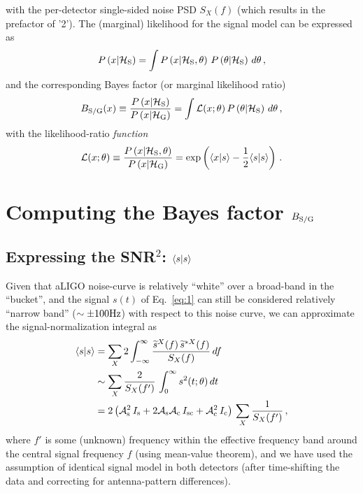 \documentclass[aps,prd,onecolumn,notitlepage,nofootinbib,superscriptaddress,altaffilletter,floatfix]{revtex4-1}
\begin{document}
with the per-detector single-sided noise PSD $S_X(f)$ (which results in the prefactor of '2').
The (marginal) likelihood for the signal model can be expressed as
\begin{equation}
  \label{eq:6}
  P\left(x|\mathcal{H}_{\mathrm{S}}\right) = \int P\left(x|\mathcal{H}_{\mathrm{S}},\theta\right)\,P\left(\theta|\mathcal{H}_{\mathrm{S}}\right)\,d\theta\,,
\end{equation}
and the corresponding Bayes factor (or marginal likelihood ratio)
\begin{equation}
  \label{eq:7}
  B_{\mathrm{S/G}}(x) \equiv \frac{P\left(x|\mathcal{H}_{\mathrm{S}}\right)}{P\left(x|\mathcal{H}_{\mathrm{G}}\right)} = \int \mathcal{L}(x;\theta)\,P\left(\theta|\mathcal{H}_{\mathrm{S}}\right)\,d\theta\,,
\end{equation}
with the likelihood-ratio \emph{function}
\begin{equation}
  \label{eq:8}
  \mathcal{L}(x;\theta) \equiv \frac{P\left(x|\mathcal{H}_{\mathrm{S}},\theta\right)}{P\left(x|\mathcal{H}_{\mathrm{G}}\right)} = \exp\left(\langle x|s\rangle - \frac{1}{2}\langle s|s\rangle\right)\,.
\end{equation}

\section{Computing the Bayes factor $B_{\mathrm{S/G}}$}
\label{sec:comp-bayes-fact}


\subsection{Expressing the SNR$^2$: $\langle s|s\rangle$}
\label{sec:computing-scalarss}
Given that aLIGO noise-curve is relatively ``white'' over a broad-band in the ``bucket'', and the signal $s(t)$ of Eq.~\eqref{eq:1} can still be
considered relatively ``narrow band'' ($\sim \pm 100\mathrm{Hz}$) with respect to this noise curve, we can approximate the signal-normalization integral as
\begin{align}
  \label{eq:17}
  \langle s|s\rangle &= \sum_X 2 \int_{-\infty}^{\infty} \frac{\widetilde{s}^X(f)\,\widetilde{s}^{*X}(f)}{S_X(f)}\,d f\\
  &\sim \sum_X \frac{2}{S_X(f')} \, \int_{0}^{\infty} s^2(t;\theta)\,dt\\
  &= 2\left( \mathcal{A}_{\mathrm{s}}^2\,I_{\mathrm{s}} + 2\mathcal{A}_{\mathrm{s}}\mathcal{A}_{\mathrm{c}}\,I_{\mathrm{sc}} + \mathcal{A}_{\mathrm{c}}^2\,I_{\mathrm{c}} \right)\, \sum_X \frac{1}{S_X(f')}\,,
\end{align}
where $f'$ is some (unknown) frequency within the effective frequency band around the central signal frequency $f$ (using mean-value theorem), and we
have used the assumption of identical signal model in both detectors (after time-shifting the data and correcting for antenna-pattern differences).
\end{document}
